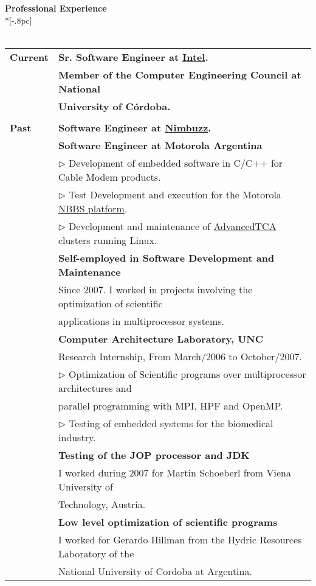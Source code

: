 \documentclass[a4paper,11pt,english]{article}
\begin{document}
{\large \bf Professional Experience}\\*[-.8pc]
\underline{\hspace{6in}}
\\
\\
\begin{tabular}{ p{2cm} l }
  {\bf Current} & {\bf Sr. Software Engineer at \href{http://www.intel.com}{Intel}.}\\ 
                & {\bf Member of the Computer Engineering Council at National} \\
				& {\bf University of C\'ordoba.}\\ \\
  {\bf Past}& 	{\bf Software Engineer at \href{http://www.nimbuzz.com/en/about}{Nimbuzz}.}\\
			& 	{\bf Software Engineer at Motorola Argentina}\\
			& 	$\triangleright$ Development of embedded software in C/C++ for Cable Modem products.\\
			&	$\triangleright$ Test Development and execution for the Motorola \href{http://www.netopia.com/software/products/nbbs/nbbs_ds.pdf}{NBBS platform}.\\
			&	$\triangleright$ Development and maintenance of \href{http://en.wikipedia.org/wiki/Advanced_Telecommunications_Computing_Architecture}{AdvancedTCA} clusters running Linux.\\
			& 	{\bf Self-employed in Software Development and Maintenance}\\
			&	Since 2007. I worked in projects involving the optimization of scientific\\
			&	applications in multiprocessor systems.\\
			& 	{\bf Computer Architecture Laboratory, UNC}\\
			& 	Research Internship, From March/2006 to October/2007.\\
			& 	$\triangleright$ Optimization of Scientific programs over multiprocessor architectures and\\
			& 	parallel programming with MPI, HPF and OpenMP.\\
			& 	$\triangleright$ Testing of embedded systems for the biomedical industry.\\
			& 	{\bf Testing of the JOP processor and JDK}\\
			& 	I worked during 2007 for Martin Schoeberl from Viena University of\\
			&	Technology,	Austria.\\
			& 	{\bf Low level optimization of scientific programs}\\
			& 	I worked for Gerardo Hillman from the Hydric Resources Laboratory of the\\
			& 	National University of Cordoba at Argentina.\\
				
\end{tabular} 
\end{document}
